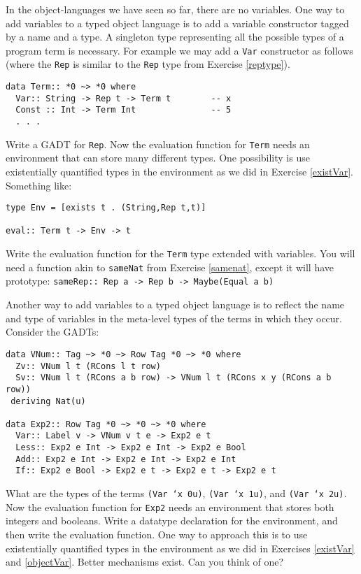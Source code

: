\documentclass[11pt,twoside,A4]{llncs}
\begin{document}
\begin{exercise} \label{objectVar}

In the object-languages we have seen so far, there are no variables. One
way to add variables to a typed object language is to add a variable
constructor tagged by a name and a type. A singleton type representing
all the possible types of a program term is necessary. For example
we may add a {\tt Var} constructor as follows (where the {\tt Rep} 
is similar to the {\tt Rep} type from Exercise \ref{reptype}).

{\small
\begin{verbatim}
data Term:: *0 ~> *0 where
  Var:: String -> Rep t -> Term t        -- x
  Const :: Int -> Term Int               -- 5
  . . .
\end{verbatim}}
Write a GADT for {\tt Rep}.
Now the evaluation function for {\tt Term}
needs an environment that can store
many different types. One possibility is
use existentially quantified types
in the environment as we did in
Exercise \ref{existVar}. Something like:

{\small
\begin{verbatim}
type Env = [exists t . (String,Rep t,t)]  

eval:: Term t -> Env -> t
\end{verbatim}}
Write the evaluation function for the {\tt Term}
type extended with variables. You will need a function
akin to {\tt sameNat} from Exercise \ref{samenat},
except it will have prototype: 
{\tt sameRep:: Rep a -> Rep b -> Maybe(Equal a b)}
\end{exercise}

\begin{exercise} \label{countingvars}
Another way to add variables to a typed object language is
to reflect the name 
and type of variables in the meta-level types of the terms in which they occur. Consider the GADTs:

{\small
\begin{verbatim}
data VNum:: Tag ~> *0 ~> Row Tag *0 ~> *0 where
  Zv:: VNum l t (RCons l t row)
  Sv:: VNum l t (RCons a b row) -> VNum l t (RCons x y (RCons a b row))
 deriving Nat(u)
 
data Exp2:: Row Tag *0 ~> *0 ~> *0 where
  Var:: Label v -> VNum v t e -> Exp2 e t
  Less:: Exp2 e Int -> Exp2 e Int -> Exp2 e Bool
  Add:: Exp2 e Int -> Exp2 e Int -> Exp2 e Int
  If:: Exp2 e Bool -> Exp2 e t -> Exp2 e t -> Exp2 e t
\end{verbatim}}
What are the types of the terms {\tt (Var `x 0u)}, {\tt (Var `x 1u)}, and
{\tt (Var `x 2u)}. Now the evaluation function for {\tt Exp2}
needs an environment that stores both integers and booleans.
Write a datatype declaration for the environment, and then
write the evaluation function. One way to approach this
is to use existentially quantified types
in the environment as we did in
Exercises \ref{existVar} and \ref{objectVar}. Better mechanisms exist. Can you think
of one?
\end{exercise}
\end{document}
